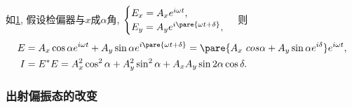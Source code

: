 \documentclass{ctexart}
\begin{document}
\begin{figure}[htb]
    \begin{subfigure}[b]{6cm}
    \centering
    \caption{}
    \label{fig:椭圆偏过检偏器}
    \end{subfigure}
    \begin{subfigure}[b]{6cm}
    \centering
    \caption{}
    \label{fig:椭圆偏振过波片}
    \end{subfigure}
    \caption{}
\end{figure}
如\cref{fig:椭圆偏过检偏器}, 假设检偏器与$x$成$\alpha$角, $\displaystyle \begin{cases}
            E_x = A_x e^{i\omega t}, \\
            E_y = A_y e^{i\pare{\omega t + \delta}},
        \end{cases}$ 则
\begin{align*}
    E &= A_x \cos\alpha e^{i\omega t} + A_y \sin \alpha e^{i\pare{\omega t + \delta}} = \pare{A_x\ cos\alpha + A_y \sin \alpha e^{i\delta}}e^{i\omega t}, \\
    I &= E^*E = A_x^2 \cos^2\alpha + A_y^2 \sin^2\alpha + A_xA_y \sin 2\alpha \cos\delta.
\end{align*}


\subsubsection{出射偏振态的改变} %
\label{ssub:出射偏振态的改变}
\end{document}
